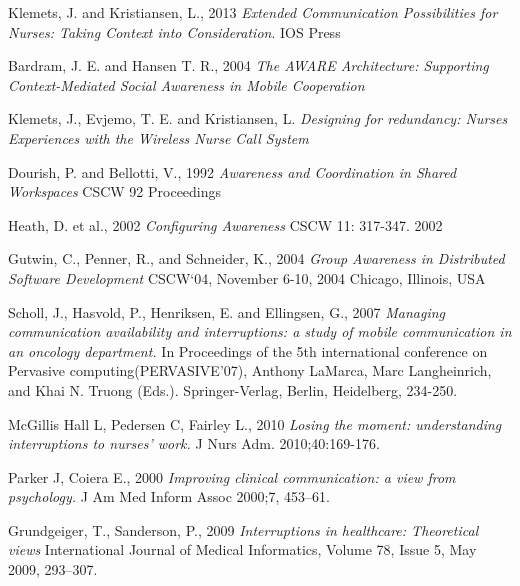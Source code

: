 \documentclass[b5paper, 11pt, norsk]{MScthesisITEM}
\begin{document}
\begin{thebibliography}{99}

  Klemets, J. and Kristiansen, L., 2013
  \emph{Extended Communication Possibilities for Nurses: Taking Context into Consideration}.
  IOS Press
  

Bardram, J. E. and Hansen T. R., 2004
\emph{The AWARE Architecture: Supporting Context-Mediated Social Awareness in Mobile Cooperation}

Klemets, J., Evjemo, T. E. and Kristiansen, L.
\emph{Designing for redundancy: Nurses Experiences with the Wireless Nurse Call System}

Dourish, P. and Bellotti, V., 1992
\emph{Awareness and Coordination in Shared Workspaces}
CSCW 92 Proceedings

Heath, D. et al., 2002
\emph{Configuring Awareness}
CSCW 11: 317-347. 2002

Gutwin, C., Penner, R., and Schneider, K., 2004
\emph{Group Awareness in Distributed Software Development}
CSCW`04, November 6-10, 2004 Chicago, Illinois, USA

Scholl, J., Hasvold, P., Henriksen, E. and Ellingsen, G., 2007
\emph {Managing communication availability and interruptions: a study of mobile communication in an oncology department.} In Proceedings of the 5th international conference on Pervasive computing(PERVASIVE'07), Anthony LaMarca, Marc Langheinrich, and Khai N. Truong (Eds.). Springer-Verlag, Berlin, Heidelberg, 234-250.

McGillis Hall L, Pedersen C, Fairley L., 2010
\emph {Losing the moment: understanding interruptions to nurses' work.}
J Nurs Adm. 2010;40:169-176.

Parker J, Coiera E., 2000
\emph {Improving clinical communication: a view from psychology.} 
J Am Med Inform Assoc 2000;7, 453–61.

Grundgeiger, T., Sanderson, P., 2009
\emph {Interruptions in healthcare: Theoretical views}
International Journal of Medical Informatics, Volume 78, Issue 5, May 2009, 293–307.


\end{thebibliography}
\end{document}
